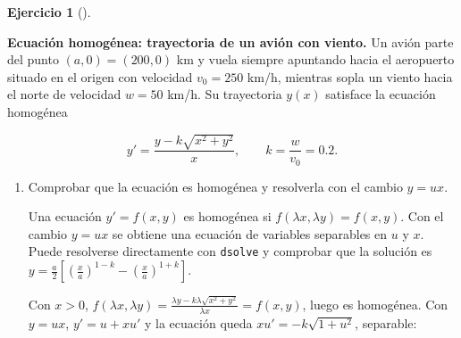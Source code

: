 \documentclass[
  spanish,
  a4paper,
]{scrreport}
\theoremstyle{definition}
\newtheorem{exercise}{Ejercicio}[chapter]
\theoremstyle{remark}
\begin{document}
\begin{exercise}[]\protect\hypertarget{exr-homogenea-avion}{}\label{exr-homogenea-avion}

\textbf{Ecuación homogénea: trayectoria de un avión con viento.} Un
avión parte del punto \((a, 0) = (200, 0)\) km y vuela siempre apuntando
hacia el aeropuerto situado en el origen con velocidad \(v_0=250\) km/h,
mientras sopla un viento hacia el norte de velocidad \(w=50\) km/h. Su
trayectoria \(y(x)\) satisface la ecuación homogénea

\[
y' = \frac{y - k\sqrt{x^2+y^2}}{x}, \qquad k = \frac{w}{v_0} = 0.2.
\]

\begin{enumerate}
\def\labelenumi{\alph{enumi}.}
\item
  Comprobar que la ecuación es homogénea y resolverla con el cambio
  \(y = ux\).

  \begin{tcolorbox}[enhanced jigsaw, arc=.35mm, bottomrule=.15mm, bottomtitle=1mm, breakable, colback=white, colbacktitle=quarto-callout-note-color!10!white, colframe=quarto-callout-note-color-frame, coltitle=black, left=2mm, leftrule=.75mm, opacityback=0, opacitybacktitle=0.6, rightrule=.15mm, title=\textcolor{quarto-callout-note-color}{\faInfo}\hspace{0.5em}{Ayuda}, titlerule=0mm, toprule=.15mm, toptitle=1mm]

  Una ecuación \(y'=f(x,y)\) es homogénea si
  \(f(\lambda x,\lambda y) = f(x, y)\). Con el cambio \(y=ux\) se
  obtiene una ecuación de variables separables en \(u\) y \(x\). Puede
  resolverse directamente con \texttt{dsolve} y comprobar que la
  solución es
  \(y = \frac{a}{2}\left[\left(\frac{x}{a}\right)^{1-k} - \left(\frac{x}{a}\right)^{1+k}\right]\).

  \end{tcolorbox}

  \begin{tcolorbox}[enhanced jigsaw, arc=.35mm, bottomrule=.15mm, bottomtitle=1mm, breakable, colback=white, colbacktitle=quarto-callout-tip-color!10!white, colframe=quarto-callout-tip-color-frame, coltitle=black, left=2mm, leftrule=.75mm, opacityback=0, opacitybacktitle=0.6, rightrule=.15mm, title=\textcolor{quarto-callout-tip-color}{\faLightbulb}\hspace{0.5em}{Solución}, titlerule=0mm, toprule=.15mm, toptitle=1mm]

  Con \(x>0\),
  \(f(\lambda x, \lambda y) = \frac{\lambda y - k\lambda\sqrt{x^2+y^2}}{\lambda x} = f(x,y)\),
  luego es homogénea. Con \(y=ux\), \(y'=u+xu'\) y la ecuación queda
  \(x u' = -k\sqrt{1+u^2}\), separable:


\end{tcolorbox}
\end{enumerate}
\end{exercise}
\end{document}
